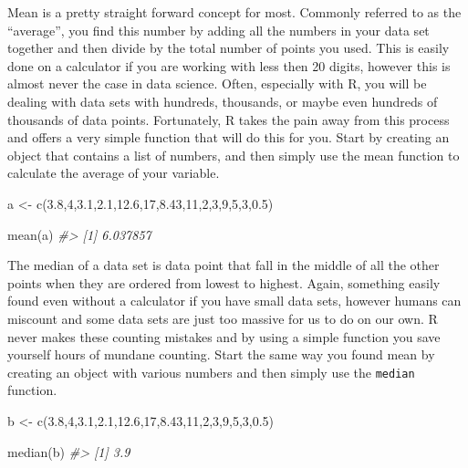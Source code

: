 \documentclass[
]{book}
\newenvironment{Shaded}{\begin{snugshade}}{\end{snugshade}}
\newcommand{\CommentTok}[1]{\textcolor[rgb]{0.56,0.35,0.01}{\textit{#1}}}
\newcommand{\DecValTok}[1]{\textcolor[rgb]{0.00,0.00,0.81}{#1}}
\newcommand{\FloatTok}[1]{\textcolor[rgb]{0.00,0.00,0.81}{#1}}
\newcommand{\FunctionTok}[1]{\textcolor[rgb]{0.00,0.00,0.00}{#1}}
\newcommand{\NormalTok}[1]{#1}
\newcommand{\OtherTok}[1]{\textcolor[rgb]{0.56,0.35,0.01}{#1}}
\begin{document}
Mean is a pretty straight forward concept for most. Commonly referred to as the ``average'', you find this number by adding all the numbers in your data set together and then divide by the total number of points you used. This is easily done on a calculator if you are working with less then 20 digits, however this is almost never the case in data science. Often, especially with R, you will be dealing with data sets with hundreds, thousands, or maybe even hundreds of thousands of data points. Fortunately, R takes the pain away from this process and offers a very simple function that will do this for you. Start by creating an object that contains a list of numbers, and then simply use the mean function to calculate the average of your variable.

\begin{Shaded}
\begin{Highlighting}[]
\NormalTok{a }\OtherTok{\textless{}{-}} \FunctionTok{c}\NormalTok{(}\FloatTok{3.8}\NormalTok{,}\DecValTok{4}\NormalTok{,}\FloatTok{3.1}\NormalTok{,}\FloatTok{2.1}\NormalTok{,}\FloatTok{12.6}\NormalTok{,}\DecValTok{17}\NormalTok{,}\FloatTok{8.43}\NormalTok{,}\DecValTok{11}\NormalTok{,}\DecValTok{2}\NormalTok{,}\DecValTok{3}\NormalTok{,}\DecValTok{9}\NormalTok{,}\DecValTok{5}\NormalTok{,}\DecValTok{3}\NormalTok{,}\FloatTok{0.5}\NormalTok{)}

\FunctionTok{mean}\NormalTok{(a)}
\CommentTok{\#\textgreater{} [1] 6.037857}
\end{Highlighting}
\end{Shaded}

The median of a data set is data point that fall in the middle of all the other points when they are ordered from lowest to highest. Again, something easily found even without a calculator if you have small data sets, however humans can miscount and some data sets are just too massive for us to do on our own. R never makes these counting mistakes and by using a simple function you save yourself hours of mundane counting. Start the same way you found mean by creating an object with various numbers and then simply use the \texttt{median} function.

\begin{Shaded}
\begin{Highlighting}[]
\NormalTok{b }\OtherTok{\textless{}{-}} \FunctionTok{c}\NormalTok{(}\FloatTok{3.8}\NormalTok{,}\DecValTok{4}\NormalTok{,}\FloatTok{3.1}\NormalTok{,}\FloatTok{2.1}\NormalTok{,}\FloatTok{12.6}\NormalTok{,}\DecValTok{17}\NormalTok{,}\FloatTok{8.43}\NormalTok{,}\DecValTok{11}\NormalTok{,}\DecValTok{2}\NormalTok{,}\DecValTok{3}\NormalTok{,}\DecValTok{9}\NormalTok{,}\DecValTok{5}\NormalTok{,}\DecValTok{3}\NormalTok{,}\FloatTok{0.5}\NormalTok{)}

\FunctionTok{median}\NormalTok{(b)}
\CommentTok{\#\textgreater{} [1] 3.9}
\end{Highlighting}
\end{Shaded}
\end{document}
